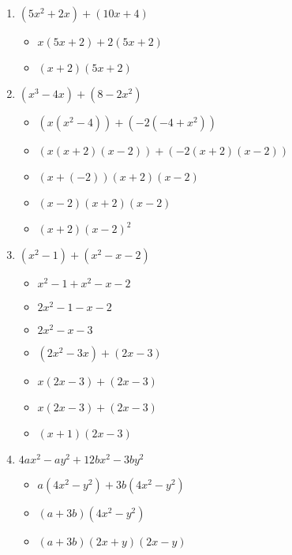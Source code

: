 \documentclass{article}
\begin{document}
\begin{onehalfspace}
\begin{enumerate}
        \item $(5x^{2} + 2x) + (10x + 4)$
        \begin{itemize}
            \item $x(5x + 2) + 2(5x + 2)$
            \item $(x + 2)(5x + 2)$
        \end{itemize}

        \item $(x^{3} - 4x) + (8 - 2x^{2})$
        \begin{itemize}
            \item $(x(x^{2} - 4)) + (-2(-4 + x^{2}))$
            \item $(x(x + 2)(x - 2)) + (-2(x + 2)(x - 2))$
            \item $(x + (-2))(x + 2)(x - 2)$
            \item $(x - 2)(x + 2)(x - 2)$
            \item $(x + 2)(x - 2)^{2}$
        \end{itemize}

        \item $(x^{2} - 1) + (x^{2} - x - 2)$
        \begin{itemize}
            \item $x^{2} - 1 + x^{2} - x - 2$
            \item $2x^{2} - 1 - x - 2$
            \item $2x^{2} - x - 3$
            \item $(2x^{2} - 3x) + (2x - 3)$
            \item $x(2x - 3) + (2x - 3)$
            \item $x(2x - 3) + (2x - 3)$
            \item $(x + 1)(2x - 3)$
        \end{itemize}

        \item $4ax^{2} - ay^{2} + 12bx^{2} - 3by^{2}$
        \begin{itemize}
            \item $a(4x^{2} - y^{2}) + 3b(4x^{2} - y^{2})$
            \item $(a + 3b)(4x^{2} - y^{2})$
            \item $(a + 3b)(2x + y)(2x - y)$
        \end{itemize}
    \end{enumerate}
\end{onehalfspace}
\end{document}
